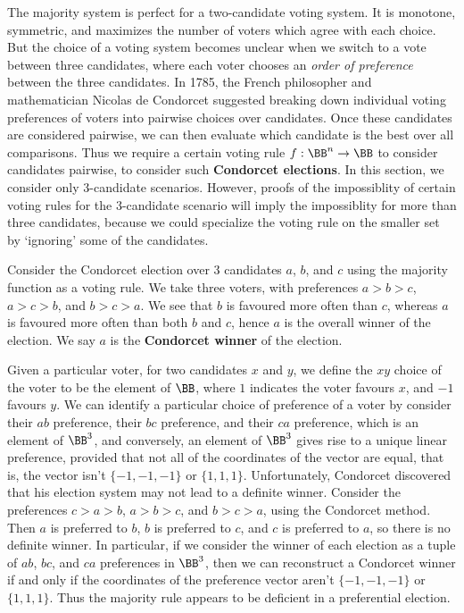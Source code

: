 The majority system is perfect for a two-candidate voting system. It is monotone, symmetric, and maximizes the number of voters which agree with each choice. But the choice of a voting system becomes unclear when we switch to a vote between three candidates, where each voter chooses an {\it order of preference} between the three candidates. In 1785, the French philosopher and mathematician Nicolas de Condorcet suggested breaking down individual voting preferences of voters into pairwise choices over candidates. Once these candidates are considered pairwise, we can then evaluate which candidate is the best over all comparisons. Thus we require a certain voting rule $f: \BB^n \to \BB$ to consider candidates pairwise, to consider such {\bf Condorcet elections}. In this section, we consider only 3-candidate scenarios. However, proofs of the impossiblity of certain voting rules for the 3-candidate scenario will imply the impossiblity for more than three candidates, because we could specialize the voting rule on the smaller set by `ignoring' some of the candidates.

\begin{example}
    Consider the Condorcet election over 3 candidates $a$, $b$, and $c$ using the majority function as a voting rule. We take three voters, with preferences $a > b > c$, $a > c > b$, and $b > c > a$. We see that $b$ is favoured more often than $c$, whereas $a$ is favoured more often than both $b$ and $c$, hence $a$ is the overall winner of the election. We say $a$ is the {\bf Condorcet winner} of the election.
\end{example}

Given a particular voter, for two candidates $x$ and $y$, we define the $xy$ choice of the voter to be the element of $\BB$, where $1$ indicates the voter favours $x$, and $-1$ favours $y$. We can identify a particular choice of preference of a voter by consider their $ab$ preference, their $bc$ preference, and their $ca$ preference, which is an element of $\BB^3$, and conversely, an element of $\BB^3$ gives rise to a unique linear preference, provided that not all of the coordinates of the vector are equal, that is, the vector isn't $\{ -1, -1, -1 \}$ or $\{ 1, 1, 1 \}$. Unfortunately, Condorcet discovered that his election system may not lead to a definite winner. Consider the preferences $c > a > b$, $a > b > c$, and $b > c > a$, using the Condorcet method. Then $a$ is preferred to $b$, $b$ is preferred to $c$, and $c$ is preferred to $a$, so there is no definite winner. In particular, if we consider the winner of each election as a tuple of $ab$, $bc$, and $ca$ preferences in $\BB^3$, then we can reconstruct a Condorcet winner if and only if the coordinates of the preference vector aren't $\{ -1, -1, -1 \}$ or $\{ 1, 1, 1 \}$. Thus the majority rule appears to be deficient in a preferential election.

